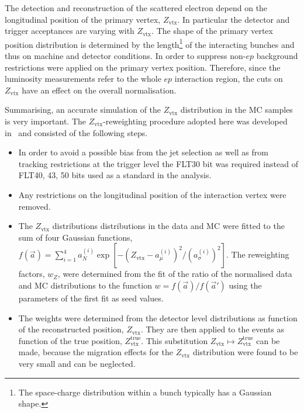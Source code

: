 The detection and reconstruction of the scattered electron depend on the longitudinal position of the primary vertex, $Z_\text{vtx}$. In particular the detector and trigger acceptances are varying with $Z_\text{vtx}$. The shape of the primary vertex position distribution is determined by the length\footnote{The space-charge distribution within a bunch typically has a Gaussian shape.} of the interacting bunches and thus on machine and detector conditions. In order to suppress non-$ep$ background restrictions were applied on the primary vertex position. Therefore, since the luminosity measurements refer to the whole $ep$ interaction region, the cuts on $Z_\text{vtx}$ have an effect on the overall normalisation. 

Summarising, an accurate simulation of the $Z_\text{vtx}$ distribution in the MC samples is very important. The $Z_\text{vtx}$-reweighting procedure adopted here was developed in~\cite{joerg} and consisted of the following steps.
\begin{itemize}
 \item In order to avoid a possible bias from the jet selection as well as from tracking restrictions at the trigger level the FLT30 bit was required instead of FLT40, 43, 50 bits used as a standard in the analysis.
 \item Any restrictions on the longitudinal position of the interaction vertex were removed.
 \item The $Z_\text{vtx}$ distributions distributions in the data and MC were fitted to the sum of four Gaussian functions, $f\left(\vec a\right)=\sum_{i=1}^4{a_N^{\left(i\right)}\exp{\left[-\left(Z_\text{vtx}-a_{\mu}^{\left(i\right)}\right)^2/\left(a_\sigma^{\left(i\right)}\right)^2\right]}}$. The reweighting factors, $w_{Z}$, were determined from the fit of the ratio of the normalised data and MC distributions to the function $w=f\left(\vec a\right)/f\left(\vec a'\right)$ using the parameters of the first fit as seed values.
 \item The weights were determined from the detector level distributions as function of the reconstructed position, $Z_\text{vtx}$. They are then applied to the events as function of the true position, $Z_\text{vtx}^\text{true}$. This substitution $Z_\text{vtx} \mapsto Z_\text{vtx}^\text{true}$ can be made, because the migration effects for the $Z_\text{vtx}$ distribution were found to be very small and can be neglected.
\end{itemize}

